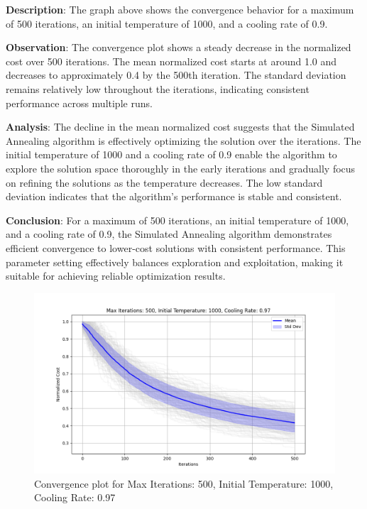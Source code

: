 \documentclass{article}
\begin{document}
    \textbf{Description}: The graph above shows the convergence behavior for a maximum of 500 iterations, an initial temperature of 1000, and a cooling rate of 0.9.

    \textbf{Observation}: The convergence plot shows a steady decrease in the normalized cost over 500 iterations. The mean normalized cost starts at around 1.0 and decreases to approximately 0.4 by the 500th iteration. The standard deviation remains relatively low throughout the iterations, indicating consistent performance across multiple runs.

    \textbf{Analysis}: The decline in the mean normalized cost suggests that the Simulated Annealing algorithm is effectively optimizing the solution over the iterations. The initial temperature of 1000 and a cooling rate of 0.9 enable the algorithm to explore the solution space thoroughly in the early iterations and gradually focus on refining the solutions as the temperature decreases. The low standard deviation indicates that the algorithm's performance is stable and consistent.

    \textbf{Conclusion}: For a maximum of 500 iterations, an initial temperature of 1000, and a cooling rate of 0.9, the Simulated Annealing algorithm demonstrates efficient convergence to lower-cost solutions with consistent performance. This parameter setting effectively balances exploration and exploitation, making it suitable for achieving reliable optimization results.

    \begin{figure}[H]
        \centering
        \includegraphics[width=\textwidth]{simulated_annealing/max_iter_500_init_temp_1000_cooling_rate_0.97}
        \caption{Convergence plot for Max Iterations: 500, Initial Temperature: 1000, Cooling Rate: 0.97}
        \label{fig:sa_500_1000_0.97}
    \end{figure}
\end{document}
